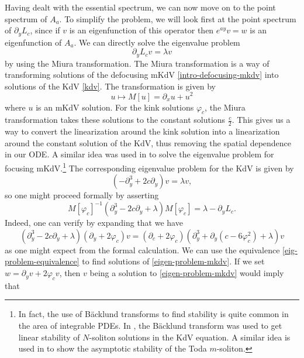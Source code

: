 Having dealt with the essential spectrum, we can now move on to the point spectrum of \(A_a\). To simplify the problem, we will look first at the point spectrum of \(\partial_y L_c\), since if \(v\) is an eigenfunction of this operator then \(e^{ay}v = w\) is an eigenfunction of \(A_a\). We can directly solve the eigenvalue problem
\begin{equation}\label{eigen-problem-mkdv}
	\partial_ yL_c v = \lambda v
\end{equation}
by using the Miura transformation. The Miura transformation is a way of transforming solutions of the defocusing mKdV \cref{intro-defocusing-mkdv} into solutions of the KdV \cref{kdv}. The transformation is given by
\begin{equation}
	u \mapsto M[u] = \partial_x u + u^2
\end{equation}
where \(u\) is an mKdV solution. For the kink solutions \(\varphi_c\), the Miura transformation takes these solutions to the constant solutions \(\frac c 2\). This gives us a way to convert the linearization around the kink solution into a linearization around the constant solution of the KdV, thus removing the spatial dependence in our ODE. A similar idea was used in \cite{pego1994asymptotic} to solve the eigenvalue problem for focusing mKdV.\footnote{In fact, the use of B\"acklund transforms to find stability is quite common in the area of integrable PDEs. In \cite{mizumachi2013asymptotic}, the B\"acklund transform was used to get linear stability of \(N\)-soliton solutions in the KdV equation. A similar idea is used in \cite{benes2012asymptotic} to show the asymptotic stability of the Toda \(m\)-soliton.} The corresponding eigenvalue problem for the KdV is given by
\begin{equation}\label{eig-problem}
	(-\partial_y^3 + 2c \partial_y) v = \lambda v,
\end{equation}
so one might proceed formally by asserting
\begin{equation}
	M[\varphi_c]^{-1} (\partial_y^3 - 2c \partial_y + \lambda) M[\varphi_c]  = \lambda - \partial_y L_c.
\end{equation}
Indeed, one can verify by expanding that we have
\begin{equation}\label{eig-problem-equivalence}
	(\partial_y^3 - 2 c \partial_y + \lambda)(\partial_y + 2\varphi_c) v = (\partial_c + 2\varphi_c)(\partial_y^3 + \partial_y(c - 6\varphi_c^2) + \lambda) v
\end{equation}
as one might expect from the formal calculation. We can use the equivalence \cref{eig-problem-equivalence} to find solutions of \cref{eigen-problem-mkdv}. If we set \(w = \partial_yv + 2\varphi_c v\), then \(v\) being a solution to \cref{eigen-problem-mkdv} would imply that
